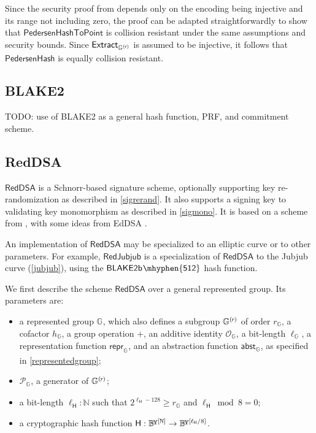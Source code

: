 \documentclass{article}
\newcommand{\crossref}[1]{\autoref{#1}}
\newcommand{\typecolon}{:}
\newcommand{\overlap}[2]{\rlap{#2}\hspace{#1}{#2}}
\newcommand{\byte}{\mathbb{B}\kern -0.1em\raisebox{0.48ex}{\overlap{0.0001em}{\scalebox{0.7}{$\mathbb{Y}$}}}}
\newcommand{\Nat}{\mathbb{N}}
\newcommand{\typeexp}[2]{{#1}\vphantom{)}^{[{#2}]}}
\newcommand{\byteseq}[1]{\typeexp{\byte}{#1}}
\newcommand{\byteseqs}{\byteseq{\Nat}}
\newcommand{\BlakeTwob}[1]{\mathsf{BLAKE2b\kern 0.05em\mhyphen{#1}}}
\newcommand{\RedDSA}{\mathsf{RedDSA}}
\newcommand{\RedDSAHash}{\mathsf{H}}
\newcommand{\RedDSAHashLength}{\ell_{\RedDSAHash}}
\newcommand{\RedJubjub}{\mathsf{RedJubjub}}
\newcommand{\Zero}{\mathcal{O}}
\newcommand{\Generator}{\mathcal{P}}
\newcommand{\subgroupr}{(\kern-0.075emr\kern-0.075em)}
\newcommand{\Extract}{\mathsf{Extract}}
\newcommand{\ParamG}[1]{{{#1}_\mathbb{G}}}
\newcommand{\GroupG}[1]{\mathbb{G}_{#1}}
\newcommand{\SubgroupG}[1]{\GroupG{#1}^{\subgroupr}}
\newcommand{\ZeroG}[1]{\Zero_{\GroupG{#1}}}
\newcommand{\GenG}[1]{\Generator_{\GroupG{#1}}}
\newcommand{\ellG}[1]{\ell_{\GroupG{#1}}}
\newcommand{\reprG}[1]{\repr_{\GroupG{#1}}}
\newcommand{\abstG}[1]{\abst_{\GroupG{#1}}}
\newcommand{\ExtractG}{\Extract_{\SubgroupG{}}}
\newcommand{\repr}{\mathsf{repr}}
\newcommand{\abst}{\mathsf{abst}}
\newcommand{\PedersenHash}{\mathsf{PedersenHash}}
\newcommand{\PedersenHashToPoint}{\mathsf{PedersenHashToPoint}}
\begin{document}
Since the security proof from \cite[Appendix A]{BGG1995}
depends only on the encoding being injective and its range not including
zero, the proof can be adapted straightforwardly to show that $\PedersenHashToPoint$
is collision resistant under the same assumptions and security bounds.
Since $\ExtractG$ is assumed to be injective, it follows that $\PedersenHash$ is
equally collision resistant.


\subsection{BLAKE2} \label{blake2}

TODO: use of BLAKE2 as a general hash function, PRF, and commitment scheme.


\subsection{RedDSA} \label{reddsa}

$\RedDSA$ is a Schnorr-based signature scheme, optionally supporting key re-randomization
as described in \crossref{sigrerand}. It also supports a signing key to validating key
monomorphism as described in \crossref{sigmono}.
It is based on a scheme from \cite[section 3]{FKMSSS2016}, with some ideas from
EdDSA \cite{BJLSY2015}.

An implementation of $\RedDSA$ may be specialized to an elliptic curve or to other
parameters. For example, $\RedJubjub$ is a specialization of $\RedDSA$ to the Jubjub
curve (\crossref{jubjub}), using the $\BlakeTwob{512}$ hash function.

We first describe the scheme $\RedDSA$ over a general represented group.
Its parameters are:
\begin{itemize}
  \item a represented group $\GroupG{}$, which also defines
        a subgroup $\SubgroupG{}$ of order $\ParamG{r}$, a cofactor $\ParamG{h}$,
        a group operation $+$, an additive identity $\ZeroG{}$,
        a bit-length $\ellG{}$, a representation function $\reprG{}$,
        and an abstraction function $\abstG{}$, as specified in
        \crossref{representedgroup};
  \item $\GenG{}$, a generator of $\SubgroupG{}$;
  \item a bit-length $\RedDSAHashLength \typecolon \Nat$ such that
        $2^{\RedDSAHashLength-128} \geq \ParamG{r}$ and $\RedDSAHashLength \bmod 8 = 0$;
  \item a cryptographic hash function $\RedDSAHash \typecolon \byteseqs \rightarrow \byteseq{\RedDSAHashLength/8}$.
\end{itemize}
\end{document}
